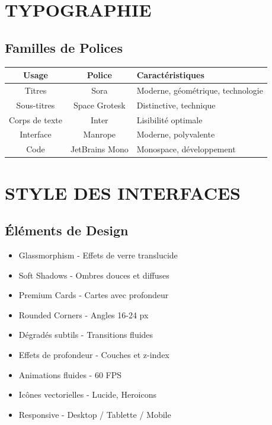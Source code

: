 \documentclass[12pt,a4paper,oneside]{book}
\begin{document}
\chapter{TYPOGRAPHIE}

\section{Familles de Polices}
\begin{center}
\begin{tabular}{|c|c|p{6cm}|}
\hline
\rowcolor{violetIA}
\color{white}\textbf{Usage} & \color{white}\textbf{Police} & \color{white}\textbf{Caractéristiques} \\
\hline
Titres & Sora & Moderne, géométrique, technologie \\
\hline
Sous-titres & Space Grotesk & Distinctive, technique \\
\hline
Corps de texte & Inter & Lisibilité optimale \\
\hline
Interface & Manrope & Moderne, polyvalente \\
\hline
Code & JetBrains Mono & Monospace, développement \\
\hline
\end{tabular}
\end{center}

\chapter{STYLE DES INTERFACES}

\section{Éléments de Design}
\begin{itemize}
\item Glassmorphism - Effets de verre translucide
\item Soft Shadows - Ombres douces et diffuses
\item Premium Cards - Cartes avec profondeur
\item Rounded Corners - Angles 16-24 px
\item Dégradés subtils - Transitions fluides
\item Effets de profondeur - Couches et z-index
\item Animations fluides - 60 FPS
\item Icônes vectorielles - Lucide, Heroicons
\item Responsive - Desktop / Tablette / Mobile
\end{itemize}
\end{document}
